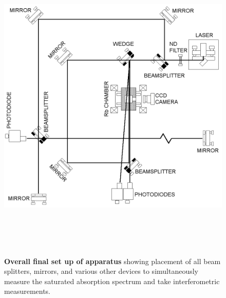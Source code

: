 \documentclass[paper=a4, fontsize=11pt]{scrartcl} %
\numberwithin{equation}{section}
\numberwithin{figure}{section}
\numberwithin{table}{section}
\begin{document}
\clearpage
\begin{figure}[h] \begin{center}
  \includegraphics[height=6in, angle = 0]{full.png}
  \caption{\textbf{Overall final set up of apparatus} showing
    placement of all beam splitters, mirrors, and various other
    devices to simultaneously measure the saturated absorption
    spectrum and take interferometric measurements. }
  \label{fig:setup}
\end{center} \end{figure}
\clearpage
\end{document}
